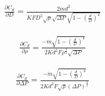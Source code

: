 \documentclass[12pt]{article}
\begin{document}
\pagestyle{empty}
\Large
{}
\pagecolor{ehandbook}
\Large


\begin{eqnarray*}
\frac{\partial C_d}{\partial D} =   
      \frac{2 \dot{m} d^2}{K F D^5 \sqrt{\rho} \sqrt{\Delta P} \sqrt{1-\left( \frac{d}{D} \right) ^4}}
\end{eqnarray*}

\begin{eqnarray*}
\frac{\partial C_d}{\partial \rho} =
        \frac{- \dot{m} \sqrt{1-\left( \frac{d}{D} \right) ^4}}{2 K d^2 F \rho^{\frac{3}{2}} \sqrt{\Delta P}}
\end{eqnarray*}

\begin{eqnarray*}
\frac{\partial C_d}{\partial \Delta P} =
      \frac{- \dot{m} \sqrt{1-\left( \frac{d}{D} \right) ^4}}{2 K d^2 F \sqrt{\rho} (\Delta P)^{\frac{3}{2}}}
\end{eqnarray*}
\end{document}
